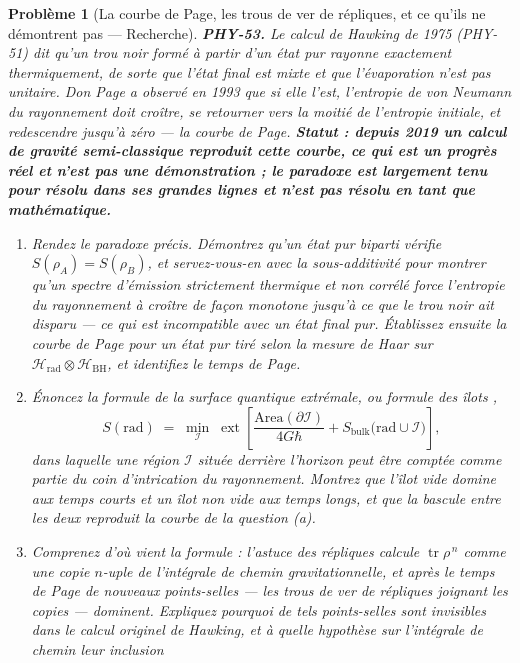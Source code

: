 \documentclass[11pt]{article}
\newtheorem{problem}{Problème}
\begin{document}
\begin{problem}[{La courbe de Page, les trous de ver de répliques, et ce qu'ils ne démontrent pas --- Recherche}]
\textbf{PHY-53.} Le calcul de Hawking de 1975 (PHY-51) dit qu'un trou noir formé à partir d'un
état pur rayonne exactement thermiquement, de sorte que l'état final est mixte et que l'évaporation
n'est pas unitaire. Don Page a observé en 1993 que si elle l'\textit{est}, l'entropie de von Neumann
du rayonnement doit croître, se retourner vers la moitié de l'entropie initiale, et redescendre
jusqu'à zéro --- la courbe de Page. \textbf{Statut : depuis 2019 un calcul de gravité semi-classique
reproduit cette courbe, ce qui est un progrès réel et n'est pas une démonstration ; le paradoxe est
largement tenu pour résolu dans ses grandes lignes et n'est pas résolu en tant que
mathématique.}
\begin{enumerate}
\item[(a)] Rendez le paradoxe précis. Démontrez qu'un état pur biparti vérifie $S(\rho_A) = S(\rho_B)$,
et servez-vous-en avec la sous-additivité pour montrer qu'un spectre d'émission strictement
thermique et non corrélé force l'entropie du rayonnement à croître de façon monotone jusqu'à ce
que le trou noir ait disparu --- ce qui est incompatible avec un état final pur. Établissez ensuite
la courbe de Page pour un état pur tiré selon la mesure de Haar sur
$\mathcal{H}_{\mathrm{rad}}\otimes\mathcal{H}_{\mathrm{BH}}$, et identifiez le temps de
Page.
\item[(b)] Énoncez la formule de la surface quantique extrémale, ou formule des \og{} îlots \fg{},
\[ S(\mathrm{rad}) \;=\; \min_{\mathcal{I}}\;\operatorname{ext}
\left[\frac{\mathrm{Area}(\partial\mathcal{I})}{4G\hbar}
+ S_{\mathrm{bulk}}\bigl(\mathrm{rad}\cup\mathcal{I}\bigr)\right], \]
dans laquelle une région $\mathcal{I}$ située derrière l'horizon peut être comptée comme partie
du coin d'intrication du rayonnement. Montrez que l'îlot vide domine aux temps courts et un îlot
non vide aux temps longs, et que la bascule entre les deux reproduit la courbe de la question
(a).
\item[(c)] Comprenez d'où vient la formule : l'astuce des répliques calcule
$\operatorname{tr}\rho^{\,n}$ comme une copie $n$-uple de l'intégrale de chemin
gravitationnelle, et après le temps de Page de nouveaux points-selles --- les trous de ver de
répliques joignant les copies --- dominent. Expliquez pourquoi de tels points-selles sont invisibles
dans le calcul originel de Hawking, et à quelle hypothèse sur l'intégrale de chemin leur inclusion

\end{enumerate}
\end{problem}
\end{document}
